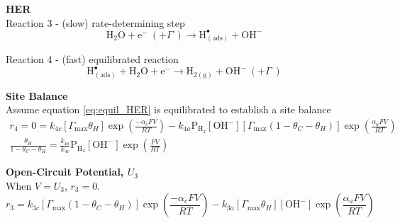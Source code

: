 \documentclass[12pt]{article}
\begin{document}
  \clearpage
  \textbf{HER} \\
  Reaction 3 - (slow) rate-determining step
  \begin{equation*}
    \text{H}_2\text{O} + \text{e}^- \ (+ \Gamma \ ) \rightarrow \text{H}^{\bullet}_{(\text{ads})} + \text{OH}^-
  \end{equation*}

  Reaction 4 - (fast) equilibrated reaction
  \begin{equation*}
    \text{H}^{\bullet}_{(\text{ads})} + \text{H}_2\text{O} + \text{e}^- \rightarrow \text{H}_{2(\text{g})} + \text{OH}^- \ (+ \Gamma \ )
  \end{equation*}

  \textbf{Site Balance} \\
  Assume equation \ref{eq:equil_HER} is equilibrated to establish a site balance
  \begin{gather*}
    r_4 = 0 = k_{4c} \left[\Gamma_{\max} \theta_H \right] \exp{ \left( \frac{-\alpha_c F V}{RT} \right)}
    - k_{4a} \text{P}_{\text{H}_2} \left[\text{OH}^- \right] \left[\Gamma_{\max} (1 - \theta_C - \theta_H) \right]
    \exp{\left( \frac{\alpha_a F V}{RT} \right)}
    \\
    \frac{\theta_H}{1 - \theta_C - \theta_H} = \frac{k_{4a}}{k_{4c}} \text{P}_{\text{H}_2} \left[\text{OH}^- \right]
    \exp{\left( \frac{ F V}{RT} \right)}
  \end{gather*}

  \textbf{Open-Circuit Potential, $U_3$}\\
  When $V = U_3$, $r_3 = 0$.
  \begin{equation*}
    r_3 = k_{3c} \left[\Gamma_{\max} (1 - \theta_C - \theta_H) \right] \exp{ \left( \frac{-\alpha_c F V}{RT} \right)}
    - k_{3a} \left[ \Gamma_{\max} \theta_H \right] \left[\text{OH}^- \right]
    \exp{\left( \frac{\alpha_a F V}{RT} \right)}
  \end{equation*}
\end{document}
